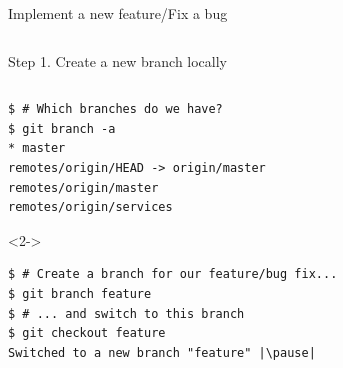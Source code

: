 \begin{frame}[fragile]{Implement a new feature/Fix a bug}
\begin{columns}
\begin{column}{0.4\textwidth}
\begin{center}
		\end{center}
	\end{column}
\end{columns}
\end{frame}

\begin{frame}[fragile]{Step 1. Create a new branch locally}
\begin{columns}
	\begin{column}{0.6\textwidth}
	\begin{lstlisting}
$ # Which branches do we have?
$ git branch -a
* master
remotes/origin/HEAD -> origin/master
remotes/origin/master
remotes/origin/services 
	\end{lstlisting}
	\begin{onlyenv}<2->
	\begin{lstlisting}
$ # Create a branch for our feature/bug fix...
$ git branch feature
$ # ... and switch to this branch
$ git checkout feature 
Switched to a new branch "feature" |\pause|


\end{lstlisting}
\end{onlyenv}
\end{column}
\end{columns}
\end{frame}
